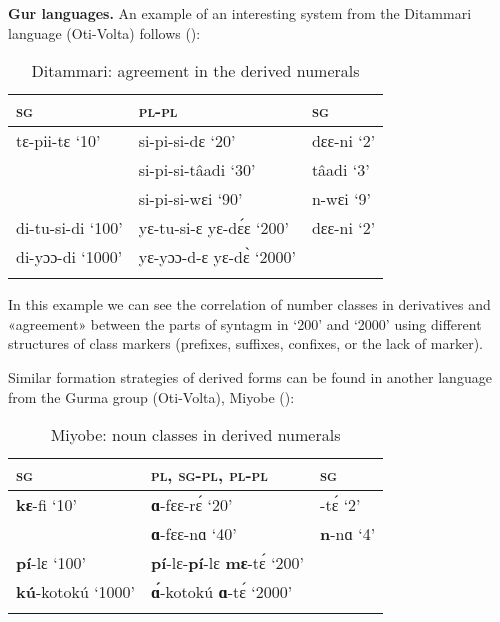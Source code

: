 \textbf{Gur languages.}  An example of an interesting system from the Ditammari language (Oti-Volta) follows ():


\begin{table}
\caption{\label{tab:1:16} Ditammari: agreement in the derived numerals}

\begin{tabularx}{\textwidth}{lXX}
\lsptoprule

\textsc{sg} & \textsc{pl}-\textsc{pl} & \textsc{sg}\\
\midrule
tɛ-pii-tɛ ‘10’ & si-pi-si-dɛ ‘20’ & dɛɛ-ni ‘2’\\
& si-pi-si-tâadi ‘30’ & tâadi ‘3’\\
& si-pi-si-wɛi ‘90’ & n-wɛi ‘9’\\
di-tu-si-di ‘100’ & yɛ-tu-si-ɛ  yɛ-d{\'{ɛ}}ɛ ‘200’ & dɛɛ-ni ‘2’\\
di-yɔɔ-di ‘1000’ & yɛ-yɔɔ-d-ɛ yɛ-d{\`{ɛ}} ‘2000’ & \\
\lspbottomrule
\end{tabularx}
\end{table}


In this example we can see the correlation of number classes in derivatives and «agreement» between the parts of syntagm in ‘200’ and ‘2000’ using different structures of class markers (prefixes, suffixes, confixes, or the lack of marker). 

Similar formation strategies of derived forms can be found in another language from the Gurma group (Oti-Volta), Miyobe ():


\begin{table}
\caption{\label{tab:1:17} Miyobe: noun classes in derived numerals}

\begin{tabularx}{\textwidth}{lXX}
\lsptoprule

\textsc{sg} & \textsc{pl}, \textsc{sg}-\textsc{pl}, \textsc{pl}-\textsc{pl} & \textsc{sg}\\
\midrule
\textbf{kɛ}-fi ‘10’ & \textbf{ɑ}-fɛɛ-r{\'{ɛ}} ‘20’ & -t{\'{ɛ}} ‘2’\\
& \textbf{ɑ}-fɛɛ-nɑ ‘40’ & \textbf{n}-nɑ ‘4’\\
\textbf{pí}-lɛ ‘100’ & \textbf{pí}-lɛ-\textbf{pí}-lɛ \textbf{mɛ}-t{\'{ɛ}} ‘200’ & \\
\textbf{kú}-kotokú ‘1000’ & \textbf{{\'{ɑ}}}-kotokú \textbf{ɑ}-t{\'{ɛ}} ‘2000’ & \\
\lspbottomrule
\end{tabularx}
\end{table}


